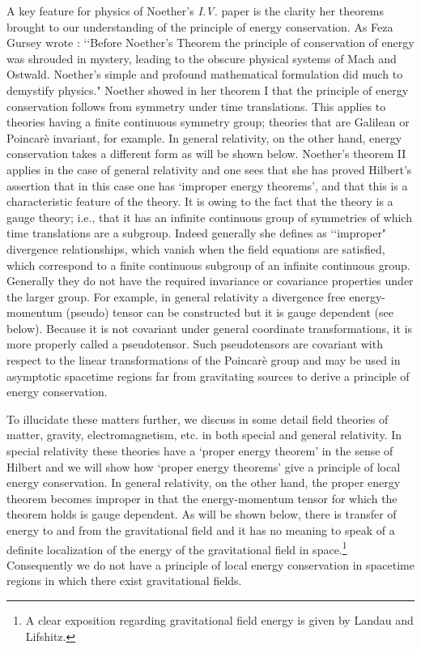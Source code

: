 A key feature for physics of Noether's {\it{I.V.}} paper is the clarity 
 her theorems brought to our understanding of the principle of
energy conservation. As Feza Gursey wrote \cite{feza}: \lq\lq Before Noether's Theorem the principle of conservation of energy was shrouded in
      mystery, leading to the obscure physical systems of Mach and Ostwald. Noether's simple and
      profound mathematical formulation did much to demystify physics."
Noether showed in her theorem I that the principle of energy conservation follows
from symmetry under time translations. This applies to theories
having a finite continuous symmetry group; theories that are Galilean or
Poincar\`{e} invariant, for example.
In general relativity,
on the other hand, 
energy conservation takes a different form as will be shown
below. Noether's theorem II applies in the case of general relativity
and one sees that she has proved Hilbert's assertion that in this case one
has  `improper energy theorems', and that this is a characteristic
feature of the theory.  It is owing to the fact that the  
theory is a gauge theory; i.e., that it has an infinite continuous
group of symmetries of which time translations are a subgroup. Indeed 
generally she defines as \lq\lq improper"
 divergence relationships, which vanish when the field equations are satisfied, 
which  correspond to a finite continuous subgroup of an infinite continuous group.
Generally they
do not have the required invariance or covariance properties under the
larger group. For example,
in general relativity a divergence
free energy-momentum (pseudo) tensor can be constructed but it is
gauge dependent (see below). Because  it is not covariant under general coordinate
transformations, it is more properly called  a pseudotensor. 
Such pseudotensors are covariant with respect to the linear transformations of the Poincar\`{e} group and may be used
in  asymptotic spacetime regions far from gravitating sources to derive a principle of
energy conservation.\cite{c&w}


To illucidate these matters further, we discuss in some detail 
  field theories of matter, gravity, electromagnetism, etc. in both
special and general relativity.  In special relativity these theories have a
`proper energy theorem' in the sense of Hilbert and we will show how `proper energy theorems' give a
principle of
local energy conservation.   In general relativity, on the other hand,
the proper energy theorem becomes improper in that the energy-momentum
tensor for which the theorem holds is gauge dependent. As will be shown
below,
there is transfer
of energy to and from the gravitational field and it has no meaning
to speak of a definite localization
of the energy of the gravitational field in space.\footnote{A 
clear exposition regarding gravitational field energy is given by Landau and Lifshitz\cite{L&L}.} Consequently we do not have a principle of local
energy conservation in spacetime regions in which there exist gravitational
fields.


